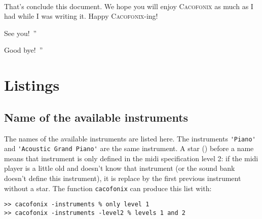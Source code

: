 \documentclass{article}
\newcommand{\cacofonix}{\textsc{Cacofonix}\xspace}
\newcommand\lvlt{\ding{105}}
\newenvironment{meenv}{ \par \noindent \makebox[6em][r]{ \textcolor{mecolor}{Me}: `` --~}}{~''}
\newenvironment{myselfenv}{ \par \noindent \makebox[6em][r]{ \textcolor{myselfcolor}{Myself}: `` --~}}{~''}
\newcommand{\me}[1]{\begin{meenv}#1\end{meenv}}
\newcommand{\myself}[1]{\begin{myselfenv}#1\end{myselfenv}}
\begin{document}
\paragraph{}

That's conclude this document. We hope you will enjoy \cacofonix as much as I had while I was writing it. Happy \cacofonix-ing!

\me{See you!}
\myself{Good bye!}

\appendix

\section{Listings}

\subsection{Name of the available instruments}
\label{sec:AvailInstruments}

The names of the available instruments are listed here. The instruments \lstinline!'Piano'! and \lstinline!'Acoustic Grand Piano'! are the same instrument. A star (\lvlt) before a name means that instrument is only defined in the midi specification level 2: if the midi player is a little old and doesn't know that instrument (or the sound bank doesn't define this instrument), it is replace by the first previous instrument without a star. The function \lstinline!cacofonix! can produce this list with:
\begin{lstlisting}
>> cacofonix -instruments % only level 1
>> cacofonix -instruments -level2 % levels 1 and 2
\end{lstlisting}
\end{document}
